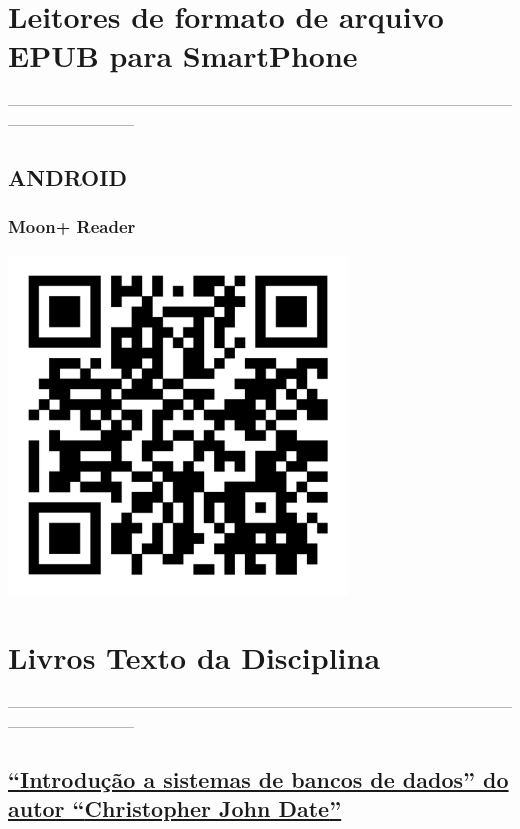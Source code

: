 \documentclass[
]{book}
\begin{document}
\section{Leitores de formato de arquivo EPUB para SmartPhone}\label{leitores-de-formato-de-arquivo-epub-para-smartphone}

---------------------------------------------------------------------------------------------------------------------------------------

\subsection{ANDROID}\label{android}

\subsubsection{\texorpdfstring{\textbf{Moon+ Reader}}{Moon+ Reader}}\label{moon-reader}

\includegraphics[width=3.54167in,height=\textheight]{images/qrcode/leitor_epub/MoonReaderPlus.jpg}

\section{Livros Texto da Disciplina}\label{livros-texto-da-disciplina}

---------------------------------------------------------------------------------------------------------------------------------------

\subsection{\texorpdfstring{\href{https://www.kufunda.net/publicdocs/Introdu\%C3\%A7\%C3\%A3o\%20a\%20Sistemas\%20de\%20Bancos\%20de\%20Dados\%20(C.\%20J.\%20Date)\%20(z-lib.org).pdf}{``Introdução a sistemas de bancos de dados'' do autor ``\textbf{Christopher John Date}''}}{``Introdução a sistemas de bancos de dados'' do autor ``Christopher John Date''}}\label{introduuxe7uxe3o-a-sistemas-de-bancos-de-dados-do-autor-christopher-john-date}
\end{document}
